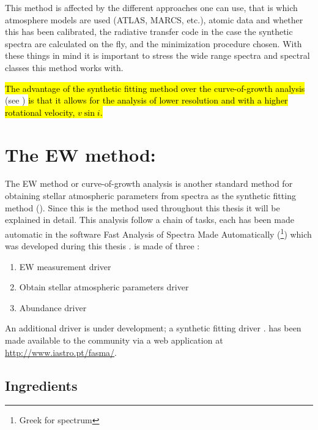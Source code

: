 This method is affected by the different approaches one can use, that is which atmosphere models are
used (ATLAS, MARCS, etc.), atomic data and whether this has been calibrated, the radiative transfer
code in the case the synthetic spectra are calculated on the fly, and the minimization procedure
chosen. With these things in mind it is important to stress the wide range spectra and spectral
classes this method works with.

\hl{The advantage of the synthetic fitting method over the curve-of-growth analysis} (see
) \hl{is that it allows for the analysis of lower resolution and with a higher
rotational velocity, $v\sin i$.}


\section{The EW method: }
\label{sec:parameters}

The EW method or curve-of-growth analysis is another standard method for obtaining stellar
atmospheric parameters from spectra as the synthetic fitting method (). Since
this is the method used throughout this thesis it will be explained in detail. This analysis follow
a chain of tasks, each has been made automatic in the software Fast Analysis of Spectra Made
Automatically (\footnote{Greek for spectrum}) which was developed during this thesis
\citep{Andreasen2017a}.  is made of three :
\begin{enumerate}
  \item EW measurement driver
  \item Obtain stellar atmospheric parameters driver
  \item Abundance driver
\end{enumerate}
An additional driver is under development; a synthetic fitting driver \citep{Tsantaki2017}.
 has been made available to the community via a web application at
\url{http://www.iastro.pt/fasma/}.


\subsection{Ingredients}

